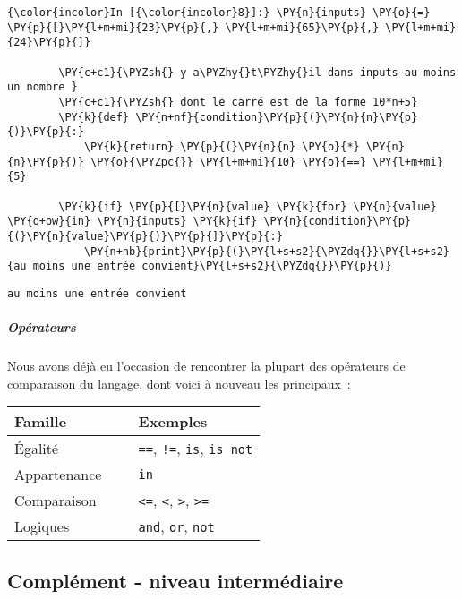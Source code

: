     \begin{Verbatim}[commandchars=\\\{\}]
{\color{incolor}In [{\color{incolor}8}]:} \PY{n}{inputs} \PY{o}{=} \PY{p}{[}\PY{l+m+mi}{23}\PY{p}{,} \PY{l+m+mi}{65}\PY{p}{,} \PY{l+m+mi}{24}\PY{p}{]}
        
        \PY{c+c1}{\PYZsh{} y a\PYZhy{}t\PYZhy{}il dans inputs au moins un nombre }
        \PY{c+c1}{\PYZsh{} dont le carré est de la forme 10*n+5}
        \PY{k}{def} \PY{n+nf}{condition}\PY{p}{(}\PY{n}{n}\PY{p}{)}\PY{p}{:}
            \PY{k}{return} \PY{p}{(}\PY{n}{n} \PY{o}{*} \PY{n}{n}\PY{p}{)} \PY{o}{\PYZpc{}} \PY{l+m+mi}{10} \PY{o}{==} \PY{l+m+mi}{5}
        
        \PY{k}{if} \PY{p}{[}\PY{n}{value} \PY{k}{for} \PY{n}{value} \PY{o+ow}{in} \PY{n}{inputs} \PY{k}{if} \PY{n}{condition}\PY{p}{(}\PY{n}{value}\PY{p}{)}\PY{p}{]}\PY{p}{:}
            \PY{n+nb}{print}\PY{p}{(}\PY{l+s+s2}{\PYZdq{}}\PY{l+s+s2}{au moins une entrée convient}\PY{l+s+s2}{\PYZdq{}}\PY{p}{)}
\end{Verbatim}


    \begin{Verbatim}[commandchars=\\\{\}]
au moins une entrée convient

    \end{Verbatim}

    \hypertarget{opuxe9rateurs}{%
\subparagraph{Opérateurs}\label{opuxe9rateurs}}

    Nous avons déjà eu l'occasion de rencontrer la plupart des opérateurs de
comparaison du langage, dont voici à nouveau les principaux~:

\begin{longtable}[]{@{}lll@{}}
\toprule
Famille & ~ & Exemples\tabularnewline
\midrule
\endhead
Égalité & ~ & \texttt{==}, \texttt{!=}, \texttt{is},
\texttt{is\ not}\tabularnewline
Appartenance & ~ & \texttt{in}\tabularnewline
Comparaison & ~ & \texttt{\textless{}=}, \texttt{\textless{}},
\texttt{\textgreater{}}, \texttt{\textgreater{}=}\tabularnewline
Logiques & ~ & \texttt{and}, \texttt{or}, \texttt{not}\tabularnewline
\bottomrule
\end{longtable}

    \hypertarget{compluxe9ment---niveau-intermuxe9diaire}{%
\subsection{Complément - niveau
intermédiaire}\label{compluxe9ment---niveau-intermuxe9diaire}}

